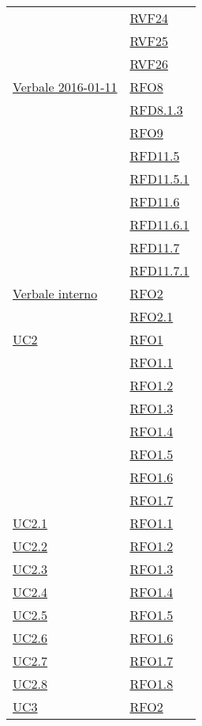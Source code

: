 \begin{longtable}{|>{\centering}m{5cm}|m{5cm}<{\centering}|}
& \hyperlink{RVF24}{RVF24}\\
& \hyperlink{RVF25}{RVF25}\\
& \hyperlink{RVF26}{RVF26}\\ \hline
\hyperlink{Verbale 2016-01-11}{Verbale 2016-01-11} & \hyperlink{RFO8}{RFO8}\\
& \hyperlink{RFD8.1.3}{RFD8.1.3}\\
& \hyperlink{RFO9}{RFO9}\\
& \hyperlink{RFD11.5}{RFD11.5}\\
& \hyperlink{RFD11.5.1}{RFD11.5.1}\\
& \hyperlink{RFD11.6}{RFD11.6}\\
& \hyperlink{RFD11.6.1}{RFD11.6.1}\\
& \hyperlink{RFD11.7}{RFD11.7}\\
& \hyperlink{RFD11.7.1}{RFD11.7.1}\\ \hline
\hyperlink{Verbale interno}{Verbale interno} & \hyperlink{RFO2}{RFO2}\\
& \hyperlink{RFO2.1}{RFO2.1}\\ \hline
\hyperref[UC2]{UC2} & \hyperlink{RFO1}{RFO1}\\
& \hyperlink{RFO1.1}{RFO1.1}\\
& \hyperlink{RFO1.2}{RFO1.2}\\
& \hyperlink{RFO1.3}{RFO1.3}\\
& \hyperlink{RFO1.4}{RFO1.4}\\
& \hyperlink{RFO1.5}{RFO1.5}\\
& \hyperlink{RFO1.6}{RFO1.6}\\
& \hyperlink{RFO1.7}{RFO1.7}\\ \hline
\hyperref[UC2.1]{UC2.1} & \hyperlink{RFO1.1}{RFO1.1}\\ \hline
\hyperref[UC2.2]{UC2.2} & \hyperlink{RFO1.2}{RFO1.2}\\ \hline
\hyperref[UC2.3]{UC2.3} & \hyperlink{RFO1.3}{RFO1.3}\\ \hline
\hyperref[UC2.4]{UC2.4} & \hyperlink{RFO1.4}{RFO1.4}\\ \hline
\hyperref[UC2.5]{UC2.5} & \hyperlink{RFO1.5}{RFO1.5}\\ \hline
\hyperref[UC2.6]{UC2.6} & \hyperlink{RFO1.6}{RFO1.6}\\ \hline
\hyperref[UC2.7]{UC2.7} & \hyperlink{RFO1.7}{RFO1.7}\\ \hline
\hyperref[UC2.8]{UC2.8} & \hyperlink{RFO1.8}{RFO1.8}\\ \hline
\hyperref[UC3]{UC3} & \hyperlink{RFO2}{RFO2}\\

\end{longtable}

